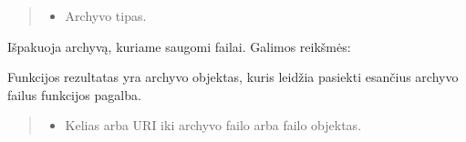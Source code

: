 \documentclass[letterpaper,10pt,lithuanian]{sphinxmanual}
\begin{document}
\begin{fulllineitems}
\begin{fulllineitems}
\begin{quote}
\begin{description}
\begin{itemize}
\item {} 
\sphinxAtStartPar
{} \sphinxhyphen{}\sphinxhyphen{} Archyvo tipas.

\end{itemize}

\end{description}\end{quote}

\sphinxAtStartPar
Išpakuoja archyvą, kuriame saugomi failai. Galimos  reikšmės:


\begin{fulllineitems}

\pysigstartsignatures
{}
\pysigstopsignatures
\end{fulllineitems}



\begin{fulllineitems}

\pysigstartsignatures
{}
\pysigstopsignatures
\end{fulllineitems}



\begin{fulllineitems}

\pysigstartsignatures
{}
\pysigstopsignatures
\end{fulllineitems}


\sphinxAtStartPar
Funkcijos rezultatas yra archyvo objektas, kuris leidžia pasiekti
esančius archyvo failus {\hyperref[\detokenize{formules:id14}]{}} funkcijos pagalba.

\end{fulllineitems}


\begin{fulllineitems}
\label{\detokenize{formules:func.decompress}}
\pysigstartsignatures
{}
\pysigstopsignatures\begin{quote}\begin{description}
\begin{itemize}
\item {} 
\sphinxAtStartPar
{} \sphinxhyphen{}\sphinxhyphen{} Kelias arba URI iki archyvo failo arba failo objektas.


\end{itemize}
\end{description}
\end{quote}
\end{fulllineitems}
\end{fulllineitems}
\end{document}
